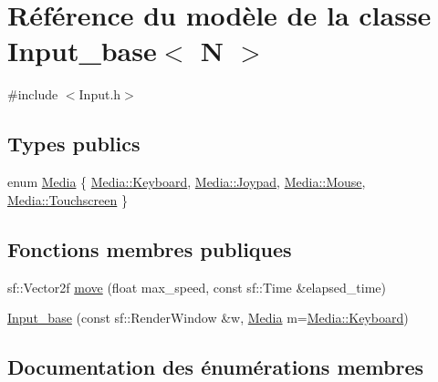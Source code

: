 \hypertarget{class_input__base}{}\section{Référence du modèle de la classe Input\+\_\+base$<$ N $>$}
\label{class_input__base}


{\ttfamily \#include $<$Input.\+h$>$}

\subsection*{Types publics}
\begin{DoxyCompactItemize}
\item 
enum \hyperlink{class_input__base_a455585e7933485981b3d7bfcad3a47c6}{Media} \{ \hyperlink{class_input__base_a455585e7933485981b3d7bfcad3a47c6a6ce4d85a628a88bbdb3ac24a8e5a9c2e}{Media\+::\+Keyboard}, 
\hyperlink{class_input__base_a455585e7933485981b3d7bfcad3a47c6ad17c22e217179fc5626be9b94f1f18fa}{Media\+::\+Joypad}, 
\hyperlink{class_input__base_a455585e7933485981b3d7bfcad3a47c6af2a47c6809d88e175dade0ef7b16aa13}{Media\+::\+Mouse}, 
\hyperlink{class_input__base_a455585e7933485981b3d7bfcad3a47c6a588711541a203a16bbc517f3f73ef7c8}{Media\+::\+Touchscreen}
 \}
\end{DoxyCompactItemize}
\subsection*{Fonctions membres publiques}
\begin{DoxyCompactItemize}
\item 
sf\+::\+Vector2f \hyperlink{class_input__base_a157b2510537e9f9ee1c29726456541e4}{move} (float max\+\_\+speed, const sf\+::\+Time \&elapsed\+\_\+time)
\item 
\hyperlink{class_input__base_a4e1efd96da3e870a9b2f6613b99e6c00}{Input\+\_\+base} (const sf\+::\+Render\+Window \&w, \hyperlink{class_input__base_a455585e7933485981b3d7bfcad3a47c6}{Media} m=\hyperlink{class_input__base_a455585e7933485981b3d7bfcad3a47c6a6ce4d85a628a88bbdb3ac24a8e5a9c2e}{Media\+::\+Keyboard})
\end{DoxyCompactItemize}


\subsection{Documentation des énumérations membres}
\mbox{\label{class_input__base_a455585e7933485981b3d7bfcad3a47c6}} 
